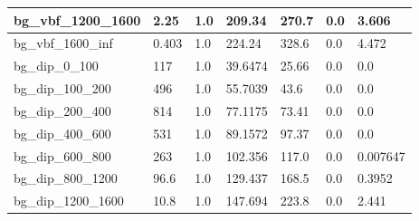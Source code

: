 \documentclass[a4paper, 10pt]{article}
\begin{document}
\begin{table}[H]
\begin{center}
\begin{tabular}{|m{23.0mm}|m{23.0mm}|m{18.0mm}|m{19.0mm}|m{19.0mm}|m{19.0mm}|m{19.0mm}|}
      \hline
      {\cellcolor{white}         bg\_vbf\_1200\_1600}& {\cellcolor{white}         2.25}& {\cellcolor{white}         1.0}& {\cellcolor{white}         209.34}& {\cellcolor{white}         270.7}& {\cellcolor{green}         0.0}& {\cellcolor{green}         3.606}\\
      \hline
      {\cellcolor{white}         bg\_vbf\_1600\_inf}& {\cellcolor{white}         0.403}& {\cellcolor{white}         1.0}& {\cellcolor{white}         224.24}& {\cellcolor{white}         328.6}& {\cellcolor{green}         0.0}& {\cellcolor{green}         4.472}\\
      \hline
      {\cellcolor{white}         bg\_dip\_0\_100}& {\cellcolor{white}         117}& {\cellcolor{white}         1.0}& {\cellcolor{white}         39.6474}& {\cellcolor{white}         25.66}& {\cellcolor{green}         0.0}& {\cellcolor{green}         0.0}\\
      \hline
      {\cellcolor{white}         bg\_dip\_100\_200}& {\cellcolor{white}         496}& {\cellcolor{white}         1.0}& {\cellcolor{white}         55.7039}& {\cellcolor{white}         43.6}& {\cellcolor{green}         0.0}& {\cellcolor{green}         0.0}\\
      \hline
      {\cellcolor{white}         bg\_dip\_200\_400}& {\cellcolor{white}         814}& {\cellcolor{white}         1.0}& {\cellcolor{white}         77.1175}& {\cellcolor{white}         73.41}& {\cellcolor{green}         0.0}& {\cellcolor{green}         0.0}\\
      \hline
      {\cellcolor{white}         bg\_dip\_400\_600}& {\cellcolor{white}         531}& {\cellcolor{white}         1.0}& {\cellcolor{white}         89.1572}& {\cellcolor{white}         97.37}& {\cellcolor{green}         0.0}& {\cellcolor{green}         0.0}\\
      \hline
      {\cellcolor{white}         bg\_dip\_600\_800}& {\cellcolor{white}         263}& {\cellcolor{white}         1.0}& {\cellcolor{white}         102.356}& {\cellcolor{white}         117.0}& {\cellcolor{green}         0.0}& {\cellcolor{green}         0.007647}\\
      \hline
      {\cellcolor{white}         bg\_dip\_800\_1200}& {\cellcolor{white}         96.6}& {\cellcolor{white}         1.0}& {\cellcolor{white}         129.437}& {\cellcolor{white}         168.5}& {\cellcolor{green}         0.0}& {\cellcolor{green}         0.3952}\\
      \hline
      {\cellcolor{white}         bg\_dip\_1200\_1600}& {\cellcolor{white}         10.8}& {\cellcolor{white}         1.0}& {\cellcolor{white}         147.694}& {\cellcolor{white}         223.8}& {\cellcolor{green}         0.0}& {\cellcolor{green}         2.441}\\

\end{tabular}
\end{center}
\end{table}
\end{document}
